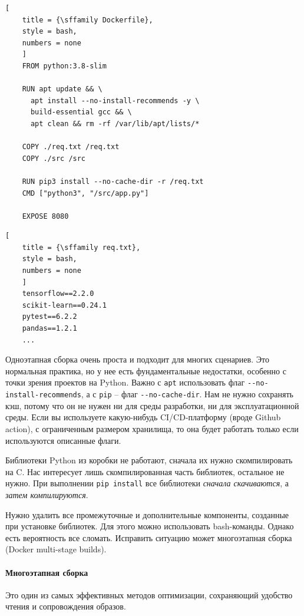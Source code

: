 \documentclass[%
	11pt,
	a4paper,
	utf8,
		]{article}
\begin{document}
\begin{minipage}[t]{0.55\textwidth}
	\begin{lstlisting}[
	title = {\sffamily Dockerfile},
	style = bash,
	numbers = none	
	]
	FROM python:3.8-slim
	
	RUN apt update && \
	  apt install --no-install-recommends -y \
	  build-essential gcc && \
	  apt clean && rm -rf /var/lib/apt/lists/*
	  
	COPY ./req.txt /req.txt
	COPY ./src /src
	
	RUN pip3 install --no-cache-dir -r /req.txt
	CMD ["python3", "/src/app.py"]
	
	EXPOSE 8080
	\end{lstlisting}
\end{minipage}
\hspace*{5mm}
\begin{minipage}[t]{0.4\textwidth}
	\begin{lstlisting}[
	title = {\sffamily req.txt},
	style = bash,
	numbers = none	
	]
	tensorflow==2.2.0
	scikit-learn==0.24.1
	pytest==6.2.2
	pandas==1.2.1
	...
	\end{lstlisting}
\end{minipage}

Одноэтапная сборка очень проста и подходит для многих сценариев. Это нормальная практика, но у нее есть фундаментальные недостатки, особенно с точки зрения проектов на Python. Важно с \texttt{apt} использовать флаг \verb|--no-install-recommends|, а с \texttt{pip} -- флаг \verb|--no-cache-dir|. Нам не нужно сохранять кэш, потому что он не нужен ни для среды разработки, ни для эксплуатационной среды. Если вы используете какую-нибудь CI/CD-платформу (вроде Github action), с ограниченным размером хранилища, то она будет работать только если используются описанные флаги.

Библиотеки Python из коробки не работают, сначала их нужно скомпилировать на C. Нас интересует лишь скомпилированная часть библиотек, остальное не нужно. При выполнении \texttt{pip install} все библиотеки \emph{сначала скачиваются}, а \emph{затем компилируются}.

Нужно удалить все промежуточные и дополнительные компоненты, созданные при установке библиотек. Для этого можно использовать bash-команды. Однако есть вероятность все сломать. Исправить ситуацию может многоэтапная сборка (Docker multi-stage builds).

\paragraph{Многоэтапная сборка} Это один из самых эффективных методов оптимизации, сохраняющий удобство чтения и сопровождения образов.
\end{document}
